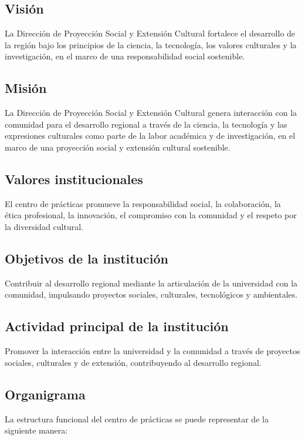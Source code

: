 \documentclass[12pt,a4paper]{article}
\begin{document}
\subsection{Visión}
La Dirección de Proyección Social y Extensión Cultural fortalece el desarrollo de la región bajo los principios de la ciencia, la tecnología, los valores culturales y la investigación, en el marco de una responsabilidad social sostenible.

\subsection{Misión}
La Dirección de Proyección Social y Extensión Cultural genera interacción con la comunidad para el desarrollo regional a través de la ciencia, la tecnología y las expresiones culturales como parte de la labor académica y de investigación, en el marco de una proyección social y extensión cultural sostenible.

\subsection{Valores institucionales}
El centro de prácticas promueve la responsabilidad social, la colaboración, la ética profesional, la innovación, el compromiso con la comunidad y el respeto por la diversidad cultural.

\subsection{Objetivos de la institución}
Contribuir al desarrollo regional mediante la articulación de la universidad con la comunidad, impulsando proyectos sociales, culturales, tecnológicos y ambientales.

\subsection{Actividad principal de la institución}
Promover la interacción entre la universidad y la comunidad a través de proyectos sociales, culturales y de extensión, contribuyendo al desarrollo regional.

\subsection{Organigrama}
La estructura funcional del centro de prácticas se puede representar de la siguiente manera:
\end{document}
